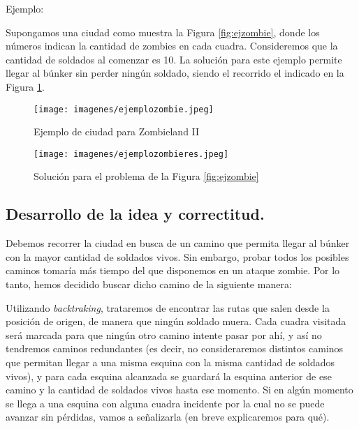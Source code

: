 Ejemplo: 

Supongamos una ciudad como muestra la Figura \ref{fig:ejzombie}, donde los números indican la cantidad de zombies en cada cuadra. Consideremos que la cantidad de soldados al comenzar es 10.
%
%
La solución para este ejemplo permite llegar al búnker sin perder ningún soldado, siendo el recorrido el indicado en la Figura \ref{fig:ejzombieres}.
%

\begin{figure}[!htb]
  \texttt{[image: imagenes/ejemplozombie.jpeg]}
  \caption{Ejemplo de ciudad para Zombieland II}\label{fig:ejzombie}
\endminipage
{}
  \texttt{[image: imagenes/ejemplozombieres.jpeg]}
  \caption{Solución para el problema de la Figura \ref{fig:ejzombie}}\label{fig:ejzombieres}
\endminipage
\end{figure}


\vspace*{0.6cm}

\subsection{Desarrollo de la idea y correctitud.}

\vspace*{0.3cm}

Debemos recorrer la ciudad en busca de un camino que permita llegar al búnker con la mayor cantidad de soldados vivos.  Sin embargo, probar todos los posibles caminos tomaría más tiempo del que disponemos en un ataque zombie.  Por lo tanto, hemos decidido buscar dicho camino de la siguiente manera:

Utilizando {\it backtraking}, trataremos de encontrar las rutas que salen desde la posición de origen, de manera que ningún soldado muera.  Cada cuadra visitada será marcada para que ningún otro camino intente pasar por ahí, y así no tendremos caminos redundantes (es decir, no consideraremos distintos caminos que permitan llegar a una misma esquina con la misma cantidad de soldados vivos), y para cada esquina alcanzada se guardará la esquina anterior de ese camino y la cantidad de soldados vivos hasta ese momento.  Si en algún momento se llega a una esquina con alguna cuadra incidente por la cual no se puede avanzar sin pérdidas, vamos a señalizarla (en breve explicaremos para qué).


